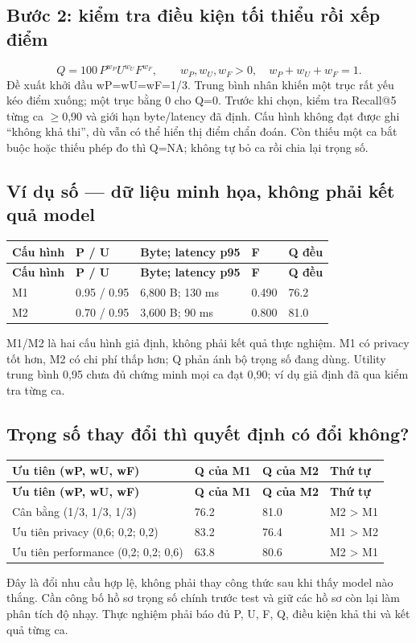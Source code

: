 \documentclass[10pt,a4paper]{article}
\begin{document}
\subsection{Bước 2: kiểm tra điều kiện tối thiểu rồi xếp điểm}
\[
Q=100\,P^{w_P}U^{w_U}F^{w_F},\qquad w_P,w_U,w_F>0,\quad w_P+w_U+w_F=1.
\]
Đề xuất khởi đầu wP=wU=wF=1/3. Trung bình nhân khiến một trục rất yếu kéo điểm xuống; một trục bằng 0 cho Q=0. Trước khi chọn, kiểm tra Recall@5 từng ca $\ge$0,90 và giới hạn byte/latency đã định. Cấu hình không đạt được ghi “không khả thi”, dù vẫn có thể hiển thị điểm chẩn đoán. Còn thiếu một ca bắt buộc hoặc thiếu phép đo thì Q=NA; không tự bỏ ca rồi chia lại trọng số.

\subsection{Ví dụ số — dữ liệu minh họa, không phải kết quả model}
\begingroup\small
\begin{longtable}{@{}P{2.188cm}P{2.854cm}P{4.946cm}P{2.758cm}P{3.329cm}@{}}
\toprule
\textbf{Cấu hình} & \textbf{P / U} & \textbf{Byte; latency p95} & \textbf{F} & \textbf{Q đều}\\\midrule
\endfirsthead
\toprule
\textbf{Cấu hình} & \textbf{P / U} & \textbf{Byte; latency p95} & \textbf{F} & \textbf{Q đều}\\\midrule
\endhead
\bottomrule\endfoot
M1 & 0.95 / 0.95 & 6,800 B; 130 ms & 0.490 & 76.2\\
\addlinespace[3pt]
M2 & 0.70 / 0.95 & 3,600 B; 90 ms & 0.800 & 81.0\\
\end{longtable}
\endgroup
M1/M2 là hai cấu hình giả định, không phải kết quả thực nghiệm. M1 có privacy tốt hơn, M2 có chi phí thấp hơn; Q phản ánh bộ trọng số đang dùng. Utility trung bình 0,95 chưa đủ chứng minh mọi ca đạt 0,90; ví dụ giả định đã qua kiểm tra từng ca.


\clearpage
\subsection{Trọng số thay đổi thì quyết định có đổi không?}
\begingroup\small
\begin{longtable}{@{}P{7.646cm}P{2.516cm}P{2.516cm}P{3.678cm}@{}}
\toprule
\textbf{Ưu tiên (wP, wU, wF)} & \textbf{Q của M1} & \textbf{Q của M2} & \textbf{Thứ tự}\\\midrule
\endfirsthead
\toprule
\textbf{Ưu tiên (wP, wU, wF)} & \textbf{Q của M1} & \textbf{Q của M2} & \textbf{Thứ tự}\\\midrule
\endhead
\bottomrule\endfoot
Cân bằng (1/3, 1/3, 1/3) & 76.2 & 81.0 & M2 > M1\\
\addlinespace[3pt]
Ưu tiên privacy (0,6; 0,2; 0,2) & 83.2 & 76.4 & M1 > M2\\
\addlinespace[3pt]
Ưu tiên performance (0,2; 0,2; 0,6) & 63.8 & 80.6 & M2 > M1\\
\end{longtable}
\endgroup
Đây là đổi nhu cầu hợp lệ, không phải thay công thức sau khi thấy model nào thắng. Cần công bố hồ sơ trọng số chính trước test và giữ các hồ sơ còn lại làm phân tích độ nhạy. Thực nghiệm phải báo đủ P, U, F, Q, điều kiện khả thi và kết quả từng ca.
\end{document}
